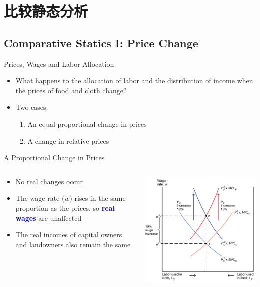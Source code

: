 \documentclass[10pt,hyperref={CJKbookmarks=true},xcolor=dvipsnames,aspectratio=169]{beamer}
\begin{document}
\section{比较静态分析}
\subsection{Comparative Statics I: Price Change}
\begin{frame}{Prices, Wages and Labor Allocation}

\begin{itemize}
\item What happens to the allocation of labor and the distribution of income
when the prices of food and cloth change? 
\item Two cases: 

\begin{enumerate}
\item An equal proportional change in prices 
\item A change in relative prices 
\end{enumerate}
\end{itemize}
\end{frame}

\begin{frame}{A Proportional Change in Prices}


\begin{columns}[onlytextwidth]
\begin{column}{0.4\textwidth}
\begin{itemize}
\item No real changes occur 
\item The wage rate ($w$) rises in the same proportion as the prices, so
\textbf{\textcolor{blue}{real wages}} are unaffected 
\item The real incomes of capital owners and landowners also remain the
same 
\end{itemize}

\end{column}
\begin{column}{0.6\textwidth}
\centering \includegraphics[width=0.7\columnwidth]{fig/sfm/lec4-17}
\end{column}
\end{columns}

\end{frame}
\end{document}
